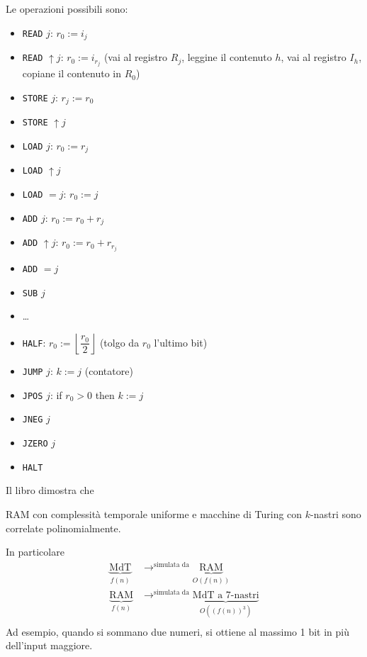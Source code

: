 \noindent Le operazioni possibili sono:
\begin{itemize}
    \item \texttt{READ} $j$: $r_0:=i_j$
    \item \texttt{READ} $\uparrow j$: $r_0:=i_{r_j}$ (vai al registro $R_j$, leggine il contenuto $h$, vai al registro $I_h$, copiane il contenuto in $R_0$)
    \item \texttt{STORE} $j$: $r_j:=r_0$
    \item \texttt{STORE} $\uparrow j$
    \item \texttt{LOAD} $j$: $r_0:=r_j$
    \item \texttt{LOAD} $\uparrow j$
    \item \texttt{LOAD} $=j$: $r_0:=j$
    \item \texttt{ADD} $j$: $r_0:=r_0+r_j$
    \item \texttt{ADD} $\uparrow j$: $r_0:=r_0+r_{r_j}$ 
    \item \texttt{ADD} $=j$
    \item \texttt{SUB} $j$
    \item \dots
    \item \texttt{HALF}: $r_0:=\left\lfloor \dfrac{r_0}{2} \right\rfloor$ (tolgo da $r_0$ l'ultimo bit)
    \item \texttt{JUMP} $j$: $k:=j$ (contatore)
    \item \texttt{JPOS} $j$: if $r_0>0$ then $k:=j$
    \item \texttt{JNEG} $j$
    \item \texttt{JZERO} $j$
    \item \texttt{HALT}
\end{itemize}
Il libro dimostra che
\begin{theorem}
    RAM con complessità temporale uniforme e macchine di Turing con $k$-nastri sono correlate polinomialmente.
\end{theorem}
In particolare 
\begin{align*}
    \underbrace{\text{MdT}}_{f(n)} &\to^{\text{simulata da}} \underbrace{\text{RAM}}_{O(f(n))}\\
    \underbrace{\text{RAM}}_{f(n)} &\to^{\text{simulata da}} \underbrace{\text{MdT a 7-nastri}}_{O((f(n))^3)}\\
\end{align*}
Ad esempio, quando si sommano due numeri, si ottiene al massimo 1 bit in più dell'input maggiore.

